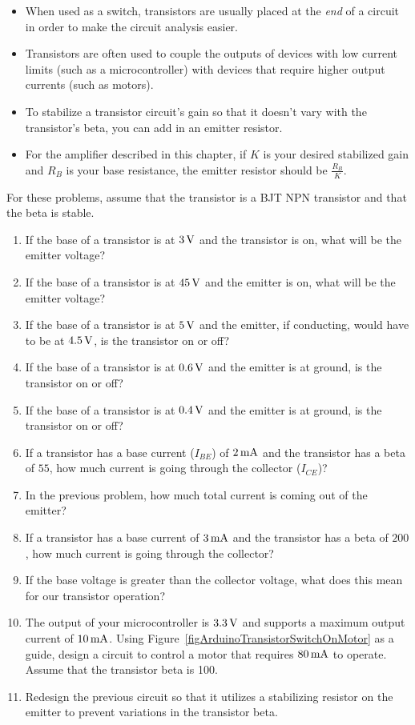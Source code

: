 \begin{itemize}
\item When used as a switch, transistors are usually placed at the \emph{end} of a circuit in order to make the circuit analysis easier.
\item Transistors are often used to couple the outputs of devices with low current limits (such as a microcontroller) with devices that require higher output currents (such as motors).
\item To stabilize a transistor circuit's gain so that it doesn't vary with the transistor's beta, you can add in an emitter resistor.
\item For the amplifier described in this chapter, if $K$ is your desired stabilized gain and $R_B$ is your base resistance, the emitter resistor should be $\frac{R_B}{K}$.
\end{itemize}

\applysection

For these problems, assume that the transistor is a BJT NPN transistor and that the beta is stable.

\begin{enumerate}
\item If the base of a transistor is at $3\,\si{\volt}$ and the transistor is on, what will be the emitter voltage?
\item If the base of a transistor is at $45\,\si{\volt}$ and the emitter is on, what will be the emitter voltage?
\item If the base of a transistor is at $5\,\si{\volt}$ and the emitter, if conducting, would have to be at $4.5\,\si{\volt}$, is the transistor on or off?
\item If the base of a transistor is at $0.6\,\si{\volt}$ and the emitter is at ground, is the transistor on or off?
\item If the base of a transistor is at $0.4\,\si{\volt}$ and the emitter is at ground, is the transistor on or off?
\item If a transistor has a base current ($I_{BE}$) of $2\,\si{\milli\ampere}$ and the transistor has a beta of $55$, how much current is going through the collector ($I_{CE}$)?
\item In the previous problem, how much total current is coming out of the emitter?
\item If a transistor has a base current of $3\,\si{\milli\ampere}$ and the transistor has a beta of $200$, how much current is going through the collector?
\item If the base voltage is greater than the collector voltage, what does this mean for our transistor operation?
\item The output of your microcontroller is $3.3\,\si{\volt}$ and supports a maximum output current of $10\,\si{\milli\ampere}$.  Using Figure~\ref{figArduinoTransistorSwitchOnMotor} as a guide, design a circuit to control a motor that requires $80\,\si{\milli\ampere}$ to operate.  Assume that the transistor beta is 100.
\item Redesign the previous circuit so that it utilizes a stabilizing resistor on the emitter to prevent variations in the transistor beta.
\end{enumerate}

